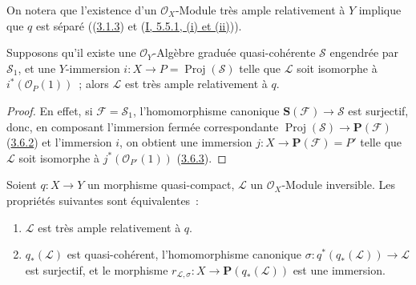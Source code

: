 On notera que l'existence d'un $\mathcal{O}_X$-Module très ample relativement
à $Y$ implique que $q$ est séparé
((\hyperref[II.3.1.3-fr]{3.1.3}) et
(\hyperref[I.5.5.1-fr]{I, 5.5.1, (i) et (ii)})).

\begin{corollary}[4.4.3]
\label{II.4.4.3-fr}
Supposons qu'il existe une $\mathcal{O}_Y$-Algèbre graduée quasi-cohérente
$\mathcal{S}$ engendrée par $\mathcal{S}_1$, et une $Y$-immersion
$i:X\to P=\operatorname{Proj}(\mathcal{S})$ telle que $\mathcal{L}$ soit
isomorphe à $i^*(\mathcal{O}_P(1))$~; alors $\mathcal{L}$ est très ample
relativement à $q$.
\end{corollary}

\begin{proof}
En effet, si $\mathcal{F}=\mathcal{S}_1$, l'homomorphisme canonique
$\mathbf{S}(\mathcal{F})\to\mathcal{S}$ est surjectif, donc, en composant
l'immersion fermée correspondante
$\operatorname{Proj}(\mathcal{S})\to\mathbf{P}(\mathcal{F})$
(\hyperref[II.3.6.2-fr]{3.6.2}) et l'immersion $i$, on obtient une immersion
$j:X\to\mathbf{P}(\mathcal{F})=P'$ telle que $\mathcal{L}$ soit isomorphe à
$j^*(\mathcal{O}_{P'}(1))$ (\hyperref[II.3.6.3-fr]{3.6.3}).
\end{proof}

\begin{proposition}[4.4.4]
\label{II.4.4.4-fr}
Soient $q:X\to Y$ un morphisme quasi-compact, $\mathcal{L}$ un
$\mathcal{O}_X$-Module inversible. Les propriétés suivantes sont
équivalentes~:
\begin{enumerate}
  \item[\rm{a)}] $\mathcal{L}$ est très ample relativement à $q$.
  \item[\rm{b)}] $q_*(\mathcal{L})$ est quasi-cohérent, l'homomorphisme
  canonique $\sigma:q^*(q_*(\mathcal{L}))\to\mathcal{L}$ est surjectif, et le
  morphisme
  $r_{\mathcal{L},\sigma}:X\to\mathbf{P}(q_*(\mathcal{L}))$ est une immersion.
\end{enumerate}
\end{proposition}

